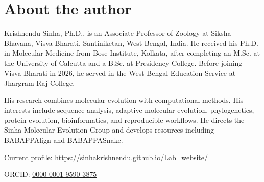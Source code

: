 \chapter*{About the author}

Krishnendu Sinha, Ph.D., is an Associate Professor of Zoology at Siksha
Bhavana, Visva-Bharati, Santiniketan, West Bengal, India. He received his
Ph.D. in Molecular Medicine from Bose Institute, Kolkata, after completing an
M.Sc. at the University of Calcutta and a B.Sc. at Presidency College. Before
joining Visva-Bharati in 2026, he served in the West Bengal Education Service
at Jhargram Raj College.

His research combines molecular evolution with computational methods. His
interests include sequence analysis, adaptive molecular evolution,
phylogenetics, protein evolution, bioinformatics, and reproducible workflows.
He directs the Sinha Molecular Evolution Group and develops resources including
\mbox{BABAPPAlign} and \mbox{BABAPPASnake}.

Current profile: \url{https://sinhakrishnendu.github.io/Lab_website/}\par
ORCID: \href{https://orcid.org/0000-0001-9590-3875}{0000-0001-9590-3875}
